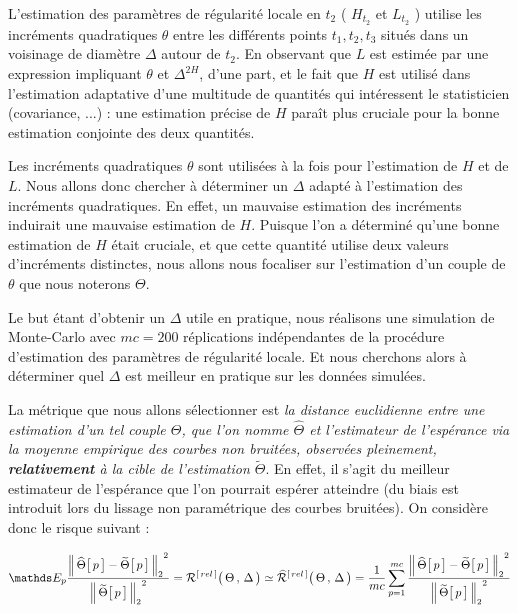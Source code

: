
L'estimation des paramètres de régularité locale en $t_2$ ( $H_{t_2}$ et $L_{t_2}$ ) utilise les incréments quadratiques $\theta$ entre les différents points $t_1, t_2, t_3$ situés dans un voisinage de diamètre $\Delta$ autour de $t_2$.
En observant que $L$ est estimée par une expression impliquant $\theta$ et $\Delta^{2 H}$, d'une part, et le fait que $H$ est utilisé dans l'estimation adaptative d'une multitude de quantités qui intéressent le statisticien (covariance, ...) : une estimation précise de $H$ paraît plus cruciale pour la bonne estimation conjointe des deux quantités. 


Les incréments quadratiques $\theta$ sont utilisées à la fois pour l'estimation de $H$ et de $L$. Nous allons donc chercher à déterminer un $\Delta$ adapté à l'estimation des incréments quadratiques. En effet, un mauvaise estimation des incréments induirait une mauvaise estimation de $H$. Puisque l'on a déterminé qu'une bonne estimation de $H$ était cruciale, et que cette quantité utilise deux valeurs d'incréments distinctes, nous allons nous focaliser sur l'estimation d'un couple de $\theta$ que nous noterons $\Theta$.

\bigskip

Le but étant d'obtenir un $\Delta$ utile en pratique, nous réalisons une simulation de Monte-Carlo avec $mc=200$ réplications indépendantes de la procédure d'estimation des paramètres de régularité locale. Et nous cherchons alors à déterminer quel $\Delta$ est meilleur en pratique sur les données simulées.

\bigskip

La métrique que nous allons sélectionner est \emph{la distance euclidienne entre une estimation d'un tel couple $\Theta$, que l'on nomme $\widehat \Theta$ et l'estimateur de l'espérance via la moyenne empirique des courbes non bruitées, observées pleinement, \textbf{relativement} à la cible de l'estimation $\widetilde \Theta$}. En effet, il s'agit du meilleur estimateur de l'espérance que l'on pourrait espérer atteindre (du biais est introduit lors du lissage non paramétrique des courbes bruitées). On considère donc le risque suivant :


\begin{equation}
	{\mathds E_p} \frac{{\distnorme 2 {\widehat \Theta\bigl[\, p \,\bigr]} {\widetilde \Theta \bigl[ \,p \,\bigr]}}^2}{{\norme 2 {\widetilde \Theta \bigl[ \,p \,\bigr]}}^2}
	=
	{\mathcal R}^{[\,rel\,]} \bigl( \, \Theta \, , \, \Delta \, \bigr)
	\simeq
\widehat{\mathcal R}^{[\,rel\,]} \bigl( \, \Theta \, , \, \Delta \, \bigr)
	=
	\frac 1 {mc} \sum\limits_{p=1}^{mc} \frac{{\distnorme 2 {\widehat \Theta\bigl[\, p \,\bigr]} {\widetilde \Theta \bigl[ \,p \,\bigr]}}^2}{{\norme 2 {\widetilde \Theta \bigl[ \,p \,\bigr]}}^2}
\end{equation}

